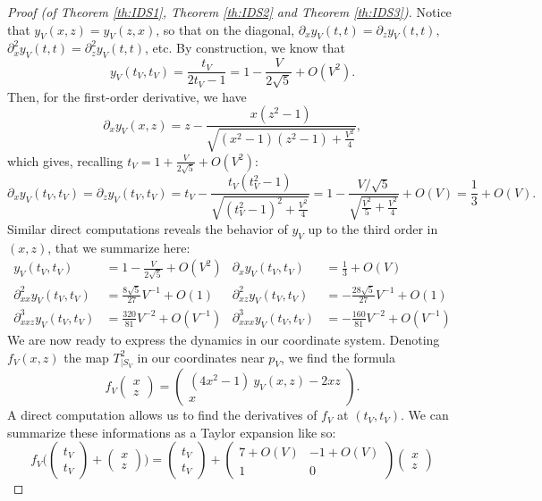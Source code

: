 \documentclass[a4paper]{article}
\theoremstyle{definition}
\begin{document}
\begin{proof}[Proof (of Theorem \ref{th:IDS1}, Theorem \ref{th:IDS2} and Theorem \ref{th:IDS3})]
Notice that $y_V(x,z)=y_V(z,x)$, so that on the diagonal, $\partial_x y_V(t,t) = \partial_z y_V(t,t),$ $\partial_x^2 y_V(t,t) = \partial_z^2 y_V(t,t)$, etc. By construction, we know that $$y_V(t_V,t_V) = \frac{t_V}{2t_V-1} = 1-\frac{V}{2\sqrt{5}} + O(V^2).$$
Then, for the first-order derivative, we have
$$ \partial_x y_V(x,z) = z - \frac{x(z^2-1)}{\sqrt{(x^2-1)(z^2-1)+\frac{V^2}{4}}}, $$
which gives, recalling $t_V=1+\frac{V}{2\sqrt{5}} + O(V^2)$: $$ \partial_x y_V(t_V,t_V) = \partial_z y_V(t_V,t_V) = t_V - \frac{t_V(t_V^2-1)}{\sqrt{(t_V^2-1)^2+\frac{V^2}{4}}} = 1 - \frac{V/\sqrt{5}}{\sqrt{\frac{V^2}{5}+\frac{V^2}{4}}} + O(V) = \frac{1}{3} + O(V). $$
Similar direct computations reveals the behavior of $y_V$ up to the third order in $(x,z)$, that we summarize here:
\begin{align*}
    y_V(t_V,t_V) &= 1-\frac{V}{2\sqrt{5}} + O(V^2)  & \partial_x y_V(t_V,t_V) &= \frac{1}{3} + O(V) \\
    \partial_{xx}^2 y_V(t_V,t_V) &= \frac{8\sqrt{5}}{27} V^{-1} + O(1) &
    \partial_{xz}^2 y_V(t_V,t_V) &= -\frac{28\sqrt{5}}{27} V^{-1} + O(1) \\
    \partial_{xxz}^3 y_V(t_V,t_V) &= \frac{320}{81} V^{-2} + O(V^{-1}) &
    \partial_{xxx}^3 y_V(t_V,t_V) &= -\frac{160}{81} V^{-2} + O(V^{-1})
\end{align*}
We are now ready to express the dynamics in our coordinate system. Denoting $f_V(x,z)$ the map $T^2_{|S_V}$ in our coordinates near $p_V$, we find the formula
$$ f_V\begin{pmatrix} x \\ z \end{pmatrix} = \begin{pmatrix} (4x^2-1) \ y_V(x,z)-2xz \\ x \end{pmatrix} .$$
A direct computation allows us to find the derivatives of $f_V$ at $(t_V,t_V)$. We can summarize these informations as a Taylor expansion like so:
$$ f_V\Big( \begin{pmatrix} t_V \\ t_V \end{pmatrix} + \begin{pmatrix} x \\ z \end{pmatrix} \Big)  =  \begin{pmatrix} t_V \\ t_V \end{pmatrix}+\begin{pmatrix} 7 + O(V) & -1 + O(V) \\ 1 & 0 \end{pmatrix}  \begin{pmatrix} x \\ z \end{pmatrix}  $$

\end{proof}
\end{document}
